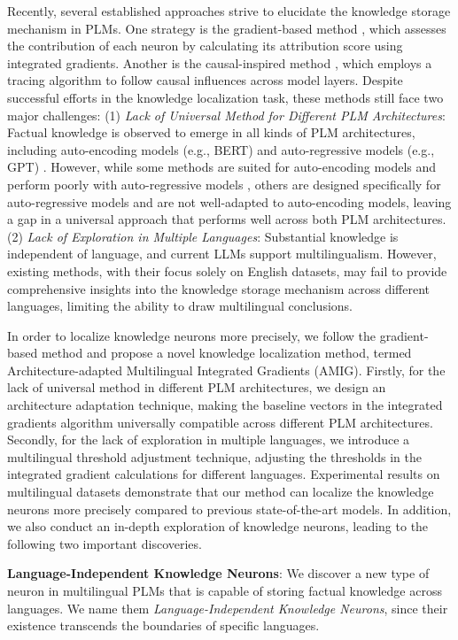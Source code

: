 \documentclass[]{article}
\begin{document}
Recently, several established approaches strive to elucidate the knowledge storage mechanism in PLMs.
One strategy is the gradient-based method \cite{ancona2019gradient}, which assesses the contribution of each neuron by calculating its attribution score using integrated gradients. Another is the causal-inspired method \cite{cao2023life}, which employs a tracing algorithm to follow causal influences across model layers. Despite successful efforts in the knowledge localization task, these methods still face two major challenges:
(1) \textit{Lack of Universal Method for Different PLM Architectures}:
Factual knowledge is observed to emerge in all kinds of PLM architectures, including auto-encoding models (e.g., BERT) \cite{mbert} and auto-regressive models (e.g., GPT) \cite{mgpt}. However, while some methods are suited for auto-encoding models and perform poorly with auto-regressive models \cite{meng2022locating}, others are designed specifically for auto-regressive models and are not well-adapted to auto-encoding models\cite{causal-inspired}, leaving a gap in a universal approach that performs well across both PLM architectures.
(2) \textit{Lack of Exploration in Multiple Languages}:
Substantial knowledge is independent of language, and current LLMs support multilingualism. However, existing methods, with their focus solely on English datasets, may fail to provide comprehensive insights into the knowledge storage mechanism across different languages, limiting the ability to draw multilingual conclusions.

In order to localize knowledge neurons more precisely, we follow the gradient-based method and propose a novel knowledge localization method, termed Architecture-adapted Multilingual Integrated Gradients (AMIG).
Firstly, for the lack of universal method in different PLM architectures, we design an architecture adaptation technique, making the baseline vectors in the integrated gradients algorithm \cite{rigorousIG} universally compatible across different PLM architectures. Secondly, for the lack of exploration in multiple languages, we introduce a multilingual threshold adjustment technique, adjusting the thresholds in the integrated gradient calculations for different languages. Experimental results on multilingual datasets demonstrate that our method can localize the knowledge neurons more precisely compared to previous state-of-the-art models. In addition, we also conduct an in-depth exploration of knowledge neurons, leading to the following two important discoveries.

\textbf{Language-Independent Knowledge Neurons}: We discover a new type of neuron in multilingual PLMs that is capable of storing factual knowledge across languages.
We name them \textit{Language-Independent Knowledge Neurons}, since their existence transcends the boundaries of specific languages.
\end{document}
